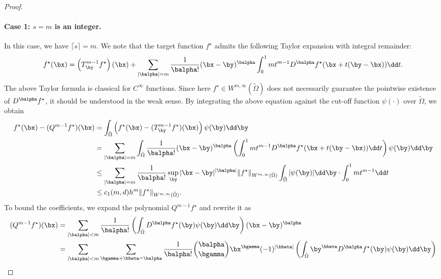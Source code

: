 \documentclass[11pt]{article}
\begin{document}
\begin{proof}
     \paragraph{Case 1: $s=m$ is an integer.} In this case, we have $\lceil s \rceil = m$. We note that the target function $f^{\star}$ admits the following Taylor expansion with integral remainder:
    \begin{equation*}
        f^{\star}(\bx) = \left(T^{m-1}_{\by} f^{\star} \right)(\bx) + \sum_{|{\balpha}| = m} \frac{1}{{\balpha}!} (\bx - \by)^{\balpha} \int_0^1 m t^{m-1} D^{\balpha} f^{\star}(\bx + t(\by - \bx)) \dd t.
    \end{equation*}
    The above Taylor formula is classical for $C^\infty$ functions. Since here $f^{\star} \in W^{m,\infty}(\tilde{\Omega})$ does not necessarily guarantee the pointwise existence of $D^{\balpha} f^{\star}$, it should be understood in the weak sense.
    By integrating the above equation against the cut-off function $\psi(\cdot)$ over $\tilde{\Omega}$, we obtain
    \begin{equation*}
        \begin{aligned}
            f^{\star}(\bx) -( Q^{m-1} f^{\star})(\bx) &= \int_{\tilde{\Omega}} \left( f^{\star}(\bx) - (T^{m-1}_{\by} f^{\star})(\bx) \right) \psi(\by) \dd \by \\
            &= \sum_{|{\balpha}| = m} \int_{\tilde{\Omega}} \frac{1}{{\balpha}!} (\bx - \by)^{\balpha} 
            \left(\int_0^1 mt^{m-1} D^{\balpha} f^{\star}(\bx + t(\by - \bx)) \dd t \right) \psi(\by) \dd \by\\
            &\leq \sum_{|{\balpha}| = m} \frac{1}{{\balpha}!} \sup_{\by} |\bx - \by|^{|{\balpha}|} \|f^{\star}\|_{W^{m,\infty}(\tilde{\Omega})} \int_{\tilde{\Omega}} |\psi(\by)| \dd \by \cdot \int_{0}^{1} m t^{m-1} \dd t\\
            &\leq c_1(m,d) h^{m} \|f^{\star}\|_{W^{m,\infty}(\tilde{\Omega})}.
        \end{aligned}
    \end{equation*}
    To bound the coefficients, we expand the polynomial $Q^{m-1} f^{\star}$ and rewrite it as
    \begin{equation*}
        \begin{aligned}
            (Q^{m-1} f^{\star})(\bx) &= \sum_{|{\balpha}| < m} \frac{1}{{\balpha}!} \left( \int_{\tilde{\Omega}} D^{\balpha} f^{\star}(\by) \psi(\by) \dd \by \right) (\bx - \by)^{\balpha} \\
            &= \sum_{|{\balpha}| < m} \sum_{{\bgamma}+{\bbeta}={\balpha}} \frac{1}{{\balpha}!} \binom{{\balpha}}{{\bgamma}} \bx^{\bgamma} (-1)^{|{\bbeta}|} \left( \int_{\tilde{\Omega}} \by^{\bbeta} D^{\balpha} f^{\star}(\by) \psi(\by) \dd \by \right)\\

\end{aligned}
\end{equation*}
\end{proof}
\end{document}
